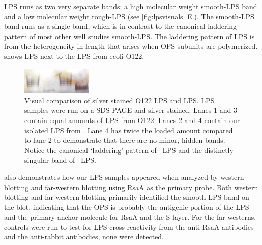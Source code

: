  \caulobacter{} \ac{LPS} runs as two very separate bands; a high molecular weight smooth-\ac{LPS} band and a low molecular weight rough-\ac{LPS} (see \cref{fig:lpsvisuals} E.). The \caulobacter{} smooth-\ac{LPS} band runs as a single band, which is in contrast to the canonical laddering pattern of most other well studies smooth-\ac{LPS}. The laddering pattern of \ac{LPS} is from the heterogeneity in length that arises when \ac{OPS} subunits are polymerized.   shows \caulobacter{} \ac{LPS} next to the \ac{LPS} from \acl{ecoli} O122.   

\begin{figure}[htb]
  \begin{center}
    \includegraphics[width=0.3\textwidth]{lps_chapter/img/lpssilverstain.jpg}
  \end{center}
  \caption[Visual comparison of \ecoli O122 \ac{LPS} and \caulobacter \ac{LPS}]{Visual comparison
    of silver stained \ecoli O122 \ac{LPS} and \caulobacter \ac{LPS}. \ac{LPS} samples were run on
    a \ac{SDS-PAGE} and silver stained. Lanes 1 and 3 contain equal amounts of \ac{LPS} from
    \ecoli O122. Lanes 2 and 4 contain our isolated \ac{LPS} from \caulobacter. Lane 4 has twice
    the loaded amount compared to lane 2 to demonstrate that there are no minor, hidden
    bands. Notice the canonical `laddering' pattern of \ecoli\ \ac{LPS} and the distinctly
    singular band of \caulobacter\ \ac{LPS}.}
  \label{fig:lpssilverstain}
\end{figure}

 also demonstrates how our \ac{LPS} samples appeared when analyzed by western blotting and far-western blotting using RsaA as the primary probe. Both western blotting and far-western blotting primarily identified the smooth-\ac{LPS} band on the blot, indicating that the \ac{OPS} is probably the antigenic portion of the \ac{LPS} and the primary anchor molecule for RsaA and the \caulobacter{} \ac{S-layer}. For the far-westerns, controls were run to test for \ac{LPS} cross reactivity from the anti-RsaA antibodies and the anti-rabbit antibodies, none were detected. 

